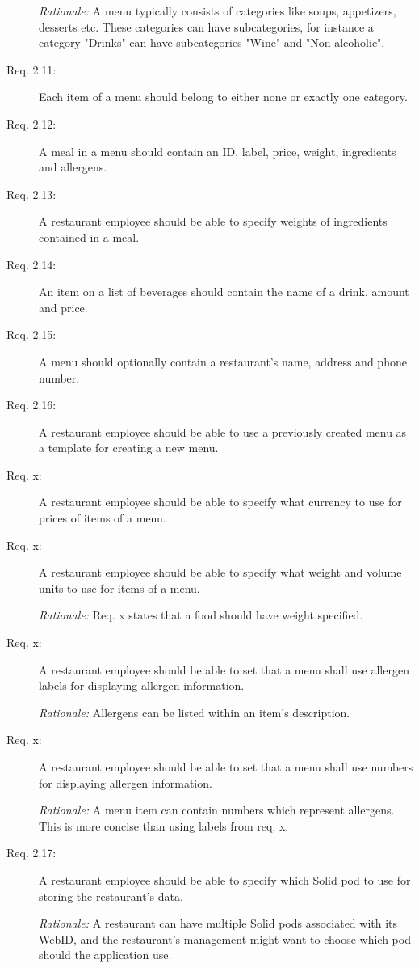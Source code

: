 \begin{description}
    \emph{Rationale:} A menu typically consists of categories like soups, appetizers, desserts etc. These categories can have subcategories, for instance a category "Drinks" can have subcategories "Wine" and "Non-alcoholic".
    \item [Req. 2.11:] Each item of a menu should belong to either none or exactly one category.
    \item [Req. 2.12:] A meal in a menu should contain an ID, label, price, weight, ingredients and allergens.
    \item [Req. 2.13:] A restaurant employee should be able to specify weights of ingredients contained in a meal.
    \item [Req. 2.14:] An item on a list of beverages should contain the name of a drink, amount and price.
    \item [Req. 2.15:] A menu should optionally contain a restaurant's name, address and phone number.
    \item [Req. 2.16:] A restaurant employee should be able to use a previously created menu as a template for creating a new menu.
    \item [Req. x:] A restaurant employee should be able to specify what currency to use for prices of items of a menu.
    \item [Req. x:] A restaurant employee should be able to specify what weight and volume units to use for items of a menu.
    
    \emph{Rationale:} Req. x states that a food should have weight specified.
    \item [Req. x:] A restaurant employee should be able to set that a menu shall use allergen labels for displaying allergen information.

    \emph{Rationale:} Allergens can be listed within an item's description.
    \item [Req. x:] A restaurant employee should be able to set that a menu shall use numbers for displaying allergen information.

    \emph{Rationale:} A menu item can contain numbers which represent allergens. This is more concise than using labels from req. x. 
    \item [Req. 2.17:] A restaurant employee should be able to specify which Solid pod to use for storing the restaurant's data.

    \emph{Rationale:} A restaurant can have multiple Solid pods associated with its WebID, and the restaurant's management might want to choose which pod should the application use.
\end{description}

